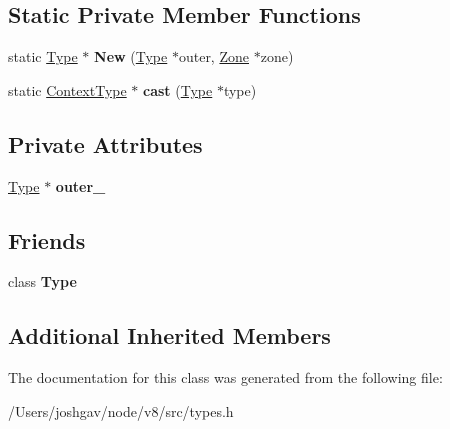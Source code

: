 \subsection*{Static Private Member Functions}
\begin{DoxyCompactItemize}
\item 
static \hyperlink{classv8_1_1internal_1_1_type}{Type} $\ast$ {\bfseries New} (\hyperlink{classv8_1_1internal_1_1_type}{Type} $\ast$outer, \hyperlink{classv8_1_1internal_1_1_zone}{Zone} $\ast$zone)\hypertarget{classv8_1_1internal_1_1_context_type_a0408c984737b3a93d73ce07942f2a79a}{}\label{classv8_1_1internal_1_1_context_type_a0408c984737b3a93d73ce07942f2a79a}

\item 
static \hyperlink{classv8_1_1internal_1_1_context_type}{Context\+Type} $\ast$ {\bfseries cast} (\hyperlink{classv8_1_1internal_1_1_type}{Type} $\ast$type)\hypertarget{classv8_1_1internal_1_1_context_type_a34366fa9a6d0541184a24f8b07566fe9}{}\label{classv8_1_1internal_1_1_context_type_a34366fa9a6d0541184a24f8b07566fe9}

\end{DoxyCompactItemize}
\subsection*{Private Attributes}
\begin{DoxyCompactItemize}
\item 
\hyperlink{classv8_1_1internal_1_1_type}{Type} $\ast$ {\bfseries outer\+\_\+}\hypertarget{classv8_1_1internal_1_1_context_type_a26fc3bf0bfb087223ac0f3f17012a23f}{}\label{classv8_1_1internal_1_1_context_type_a26fc3bf0bfb087223ac0f3f17012a23f}

\end{DoxyCompactItemize}
\subsection*{Friends}
\begin{DoxyCompactItemize}
\item 
class {\bfseries Type}\hypertarget{classv8_1_1internal_1_1_context_type_a18dba29b4f3e91d6d2bc53472a6bb7cc}{}\label{classv8_1_1internal_1_1_context_type_a18dba29b4f3e91d6d2bc53472a6bb7cc}

\end{DoxyCompactItemize}
\subsection*{Additional Inherited Members}


The documentation for this class was generated from the following file\+:\begin{DoxyCompactItemize}
\item 
/\+Users/joshgav/node/v8/src/types.\+h\end{DoxyCompactItemize}
